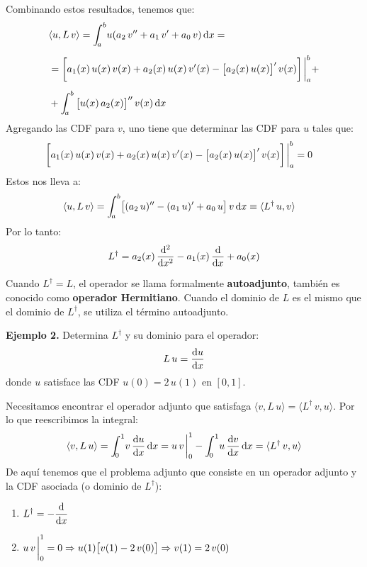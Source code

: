 \documentclass[12pt]{article}
\newcommand{\pderivada}[1]{\ensuremath{{#1}^{\prime}}}
\newcommand{\sderivada}[1]{\ensuremath{{#1}^{\prime \prime}}}
\def\scaleint#1{\vcenter{\hbox{\scaleto[3ex]{\displaystyle\int}{#1}}}}
\def\bs{\mkern-12mu}
\numberwithin{equation}{section}
\begin{document}
Combinando estos resultados, tenemos que:
\begin{eqnarray}
\begin{aligned}[b]
&\langle u , L \, v \rangle =  \scaleint{5ex}_{\bs a}^{b} u (a_{2} \, \sderivada{v} + a_{1} \, \pderivada{v} + a_{0} \, v) \dd{x} = \\[0.5em] 
&= \bigg[ a_{1}(x) \, u(x) \, v(x) + a_{2}(x) \, u(x) \, \pderivada{v}(x) - \big[ a_{2}(x) \, u(x) \big]^{\prime} \, v(x) \bigg] \eval_{a}^{b} + \\[0.5em]
&+ \scaleint{5ex}_{\bs a}^{b} \, \big[ u(x) \, a_{2} (x) \big]^{\prime \prime} \, v(x) \dd{x}
\end{aligned}
\label{eq:ecuacion_04_19}
\end{eqnarray}
Agregando las CDF para $v$,  uno tiene que determinar las CDF para $u$ tales que:
\begin{align*}
&\bigg[ a_{1}(x) \, u(x) \, v(x) + a_{2}(x) \, u(x) \, \pderivada{v}(x) - \big[ a_{2}(x) \, u(x) \big]^{\prime} \, v(x) \bigg] \eval_{a}^{b} = 0
\end{align*}
Estos nos lleva a:
\begin{align*}
\langle u , L \, v \rangle &= \scaleint{5ex}_{\bs a}^{b}  \big[ (a_{2} \, u)^{\prime \prime} - (a_{1} \, u)^{\prime} + a_{0} \, u \big] \, v \dd{x} \equiv \langle L^{\dagger} \, u, v \rangle 
\end{align*}
Por lo tanto:
\begin{align}
L^{\dagger} = a_{2}(x) \, \dv[2]{x} - a_{1}(x) \, \dv{x} + a_{0}(x)
\label{eq:ecuacion_04_20}
\end{align}

Cuando $L^{\dagger} = L$,  el operador se llama formalmente \textbf{autoadjunto}, también es conocido como \textbf{operador Hermitiano}. Cuando el dominio de $L$ es el mismo que el dominio de $L^{\dagger}$, se utiliza el término autoadjunto.
\par
\noindent
\textbf{Ejemplo 2. } Determina $L^{\dagger}$ y su dominio para el operador:
\begin{align*}
L \, u = \dv{u}{x}
\end{align*}
donde $u$ satisface las CDF $u(0) = 2 \, u(1)$ en $[0, 1]$.
\par
Necesitamos encontrar el operador adjunto que satisfaga $\langle v, L \, u \rangle = \langle L^{\dagger} \, v, u \rangle$. Por lo que reescribimos la integral:
\begin{eqnarray*}
\langle v, L \, u \rangle =  \scaleint{5ex}_{\bs 0}^{1} v \, \dv{u}{x} \dd{x} =  u \, v \eval_{0}^{1} - \scaleint{5ex}_{\bs 0}^{1} u \, \dv{v}{x} \dd{x} =  \langle L^{\dagger} \, v, u \rangle
\end{eqnarray*}
De aquí tenemos que el problema adjunto que consiste en un operador adjunto y la CDF asociada (o dominio de $L^{\dagger}$):
\begin{enumerate}
\item $L^{\dagger} = - \displaystyle \dv{x}$
\item $\displaystyle u \, v \eval_{0}^{1} = 0 \Rightarrow u (1) \big[ v(1) - 2 \, v(0) \big] \Rightarrow v (1) = 2 \, v(0)$
\end{enumerate}
\end{document}
